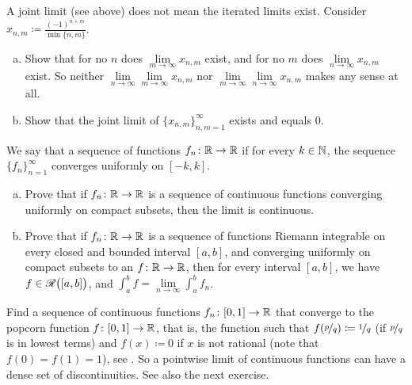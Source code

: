 \begin{exercise}
A joint limit (see above) does not mean the iterated limits exist.
Consider $x_{n,m} \coloneqq \frac{{(-1)}^{n+m}}{\min \{n,m \}}$.
\begin{enumerate}[a)]
\item
Show that for no $n$ does
$\lim\limits_{m \to \infty} x_{n,m}$ exist, and for no $m$
does 
$\lim\limits_{n \to \infty} x_{n,m}$ exist.  So neither
$\lim\limits_{n\to\infty}\lim\limits_{m \to \infty} x_{n,m}$ nor
$\lim\limits_{m\to\infty}\lim\limits_{n \to \infty} x_{n,m}$ makes any sense
at all.
\item
Show that the joint limit of $\{ x_{n,m} \}_{n,m=1}^\infty$ exists and equals 0.
\end{enumerate}
\end{exercise}

\begin{exercise}
We say that a sequence of functions $f_n \colon {\mathbb{R}} \to {\mathbb{R}}$
\emph{}
if for every $k \in {\mathbb{N}}$,
the sequence $\{ f_n \}_{n=1}^\infty$ converges uniformly on $[-k,k]$.
\begin{enumerate}[a)]
\item
Prove that if $f_n \colon {\mathbb{R}} \to {\mathbb{R}}$ is a sequence of
continuous functions converging uniformly on compact subsets, then
the limit is continuous.
\item 
Prove that if $f_n \colon {\mathbb{R}} \to {\mathbb{R}}$ is a sequence of
functions Riemann integrable on every closed and bounded interval $[a,b]$,
and converging uniformly on compact subsets to an $f \colon {\mathbb{R}} \to {\mathbb{R}}$,
then for every interval $[a,b]$, we have $f \in {\mathscr{R}}\bigl([a,b]\bigr)$, and
$\int_a^b f = \lim\limits_{n\to\infty} \int_a^b f_n$.
\end{enumerate}
\end{exercise}

\begin{exercise}[Challenging]
Find a sequence of continuous functions $f_n \colon [0,1] \to {\mathbb{R}}$ that
converge to the popcorn function $f \colon [0,1] \to {\mathbb{R}}$, that is, the
function such that $f(\nicefrac{p}{q}) \coloneqq \nicefrac{1}{q}$ (if $\nicefrac{p}{q}$
is in lowest terms) and $f(x) \coloneqq 0$ if $x$ is not rational (note
that $f(0) = f(1) = 1$),
see .
So a pointwise limit of continuous functions can have a dense set of
discontinuities.  See also the next exercise.
\end{exercise}

